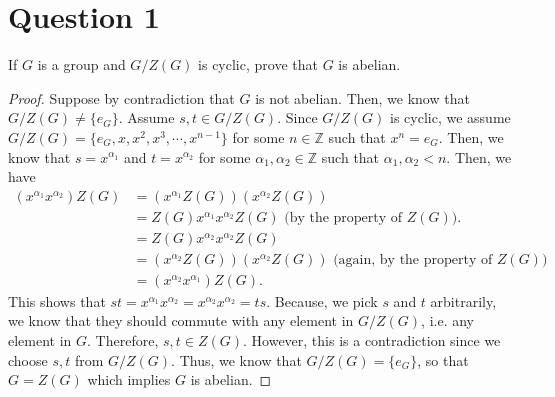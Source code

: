 \section{Question 1}

\begin{question}
    If $G$ is a group and $G / Z(G)$ is cyclic, prove that $G$ is abelian.
\end{question}

\begin{answer}
    \begin{proof}
        Suppose by contradiction that $G$ is not abelian. Then, we know that $G/Z(G) \neq \{e_G\}$. Assume $s,t \in G/Z(G)$. Since $G/Z(G)$ is cyclic, we assume $G/Z(G) = \{e_G,x,x^2,x^3,\cdots,x^{n-1}\}$ for some $n \in \mathbb{Z}$ such that $x^n=e_G$. Then, we know that $s = x^{\alpha_1}$ and $t = x^{\alpha_2}$ for some $\alpha_1,\alpha_2 \in \mathbb{Z}$ such that $\alpha_1, \alpha_2 < n$.  Then, we have
        \begin{equation}
            \begin{aligned}
                (x^{\alpha_1}x^{\alpha_2})Z(G) &= (x^{\alpha_1}Z(G))(x^{\alpha_2}Z(G))\\
                &= Z(G)x^{\alpha_1}x^{\alpha_2}Z(G) \text{ (by the property of $Z(G)$).}\\
                &= Z(G)x^{\alpha_2}x^{\alpha_2}Z(G)\\
                &= (x^{\alpha_2}Z(G))(x^{\alpha_2}Z(G)) \text{ (again, by the property of $Z(G)$)}\\
                &= (x^{\alpha_2}x^{\alpha_1})Z(G).
            \end{aligned}
        \end{equation}
        This shows that $st = x^{\alpha_1}x^{\alpha_2} = x^{\alpha_2}x^{\alpha_2} = ts$. Because, we pick $s$ and $t$ arbitrarily, we know that they should commute with any element in $G/Z(G)$, i.e. any element in $G$. Therefore, $s,t \in Z(G)$. However, this is a contradiction since we choose $s,t$ from $G/Z(G)$. Thus, we know that $G/Z(G) = \{e_G\}$, so that $G=Z(G)$ which implies $G$ is abelian. 
    \end{proof}
\end{answer}
